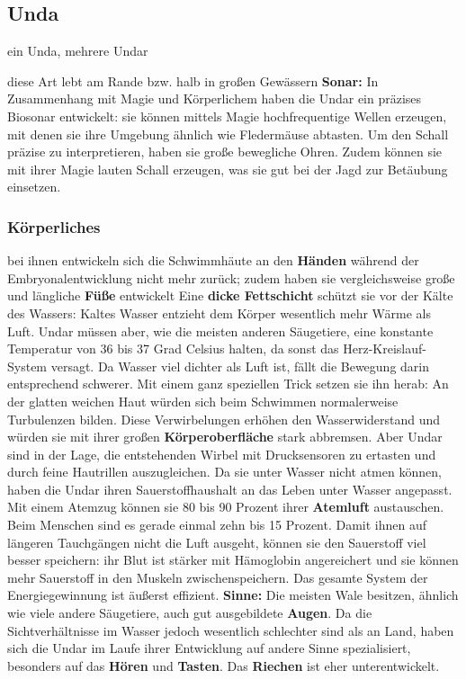 \subsection{Unda} \label{rasse:unda}
ein Unda, mehrere Undar
\begin{outline}
	\1 diese Art lebt am Rande bzw. halb in großen Gewässern
	\1 \textbf{Sonar:} In Zusammenhang mit Magie und Körperlichem haben die Undar ein präzises Biosonar entwickelt: sie können mittels Magie hochfrequentige Wellen erzeugen, mit denen sie ihre Umgebung ähnlich wie Fledermäuse abtasten. Um den Schall präzise zu interpretieren, haben sie große bewegliche Ohren. Zudem können sie mit ihrer Magie lauten Schall erzeugen, was sie gut bei der Jagd zur Betäubung einsetzen. 
\end{outline}

\subsubsection{Körperliches}
\begin{outline}
	\1 bei ihnen entwickeln sich die Schwimmhäute an den \textbf{Händen} während der Embryonalentwicklung nicht mehr zurück; zudem haben sie vergleichsweise große und längliche \textbf{Füße} entwickelt
	\1 Eine \textbf{dicke Fettschicht} schützt sie vor der Kälte des Wassers: Kaltes Wasser entzieht dem Körper wesentlich mehr Wärme als Luft. Undar müssen aber, wie die meisten anderen Säugetiere, eine konstante Temperatur von 36 bis 37 Grad Celsius halten, da sonst das Herz-Kreislauf-System versagt.
	\1 Da Wasser viel dichter als Luft ist, fällt die Bewegung darin entsprechend schwerer. Mit einem ganz speziellen Trick setzen sie ihn herab: An der glatten weichen Haut würden sich beim Schwimmen normalerweise Turbulenzen bilden. Diese Verwirbelungen erhöhen den Wasserwiderstand und würden sie mit ihrer großen \textbf{Körperoberfläche} stark abbremsen. Aber Undar sind in der Lage, die entstehenden Wirbel mit Drucksensoren zu ertasten und durch feine Hautrillen auszugleichen.
	\1 Da sie unter Wasser nicht atmen können, haben die Undar ihren Sauerstoffhaushalt an das Leben unter Wasser angepasst. Mit einem Atemzug können sie 80 bis 90 Prozent ihrer \textbf{Atemluft} austauschen. Beim Menschen sind es gerade einmal zehn bis 15 Prozent. Damit ihnen auf längeren Tauchgängen nicht die Luft ausgeht, können sie den Sauerstoff viel besser speichern: ihr Blut ist stärker mit Hämoglobin angereichert und sie können mehr Sauerstoff in den Muskeln zwischenspeichern. Das gesamte System der Energiegewinnung ist äußerst effizient.
	\1 \textbf{Sinne:} Die meisten Wale besitzen, ähnlich wie viele andere Säugetiere, auch gut ausgebildete \textbf{Augen}. Da die Sichtverhältnisse im Wasser jedoch wesentlich schlechter sind als an Land, haben sich die Undar im Laufe ihrer Entwicklung auf andere Sinne spezialisiert, besonders auf das \textbf{Hören} und \textbf{Tasten}. Das \textbf{Riechen} ist eher unterentwickelt.
\end{outline}

